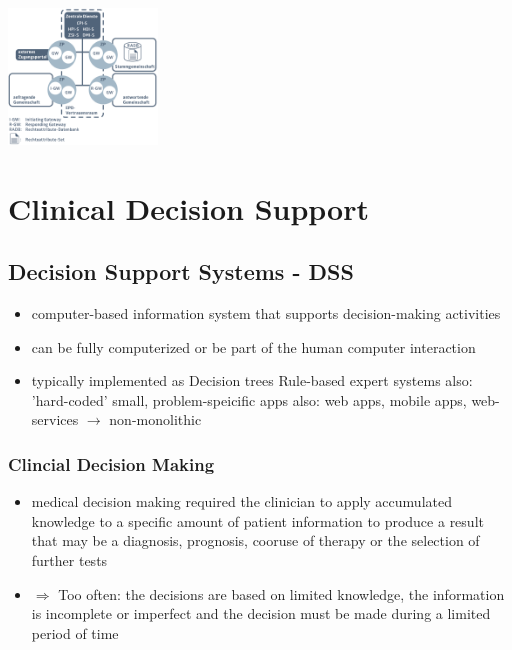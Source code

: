 \documentclass{report}
\newenvironment{Figure}
	{\par\medskip\noindent\minipage{\linewidth}}
	{\endminipage\par\medskip}
\theoremstyle{definition}
\theoremstyle{example}
\begin{document}
\begin{Figure}
   \centering
    \includegraphics[width=150px]{img/EPRA.png}
        \label{fig:Schema of EPR}
\end{Figure}


\chapter{Clinical Decision Support}

\section{Decision Support Systems - DSS}
\begin{itemize}
   \item computer-based information system that supports decision-making activities
   \item can be fully computerized or be part of the human computer interaction
   \item typically implemented as
   \subitem Decision trees
   \subitem Rule-based expert systems
   \subitem also: 'hard-coded' small, problem-speicific apps
   \subitem also: web apps, mobile apps, web-services $\rightarrow$ non-monolithic 
\end{itemize}

\subsection{Clincial Decision Making}
\begin{itemize}
   \item medical decision making required the clinician to apply accumulated knowledge to a specific amount of patient information to produce a result that may be a diagnosis, prognosis, cooruse of therapy or the selection of further tests
   \item $\Rightarrow$ Too often: the decisions are based on limited knowledge, the information is incomplete or imperfect and the decision must be made during a limited period of time
\end{itemize}
\end{document}
